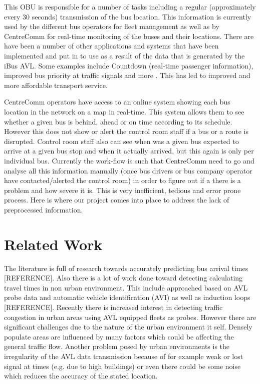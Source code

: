 This OBU is responsible for a number of tasks including a regular (approximately every 30 seconds) transmission of the bus location. This information is currently used by the different bus operators for fleet management as well as by CentreComm for real-time monitoring of the buses and their locations. There are have been a number of other applications and systems that have been implemented and put in to use as a result of the data that is generated by the iBus AVL. Some examples include Countdown (real-time passenger information), improved bus priority at traffic signals and more \cite{Hounsell201276}. This has led to improved and more affordable transport service.

CentreComm operators have access to an online system showing each bus location in the network on a map in real-time. This system allows them to see whether a given bus is behind, ahead or on time according to its schedule. However this does not show or alert the control room staff if a bus or a route is disrupted. Control room staff also can see when was a given bus expected to arrive at a given bus stop and when it actually arrived, but this again is only per individual bus. Currently the work-flow is such that CentreComm need to go and analyse all this information manually (once bus drivers or bus company operator have contacted/alerted the control room) in order to figure out if a there is a problem and how severe it is. This is very inefficient, tedious and error prone process. Here is where our project comes into place to address the lack of preprocessed information.

\section{Related Work}
The literature is full of research towards accurately predicting bus arrival times [REFERENCE]. Also there is a lot of work done toward detecting calculating travel times in non urban environment. This include approached based on AVL probe data and automatic vehicle identification (AVI) as well as induction loops [REFERENCE]. Recently there is increased interest in detecting traffic congestion in urban areas using AVL equipped fleets as probes. However there are significant challenges due to the nature of the urban environment it self. Densely populate areas are influenced by many factors which could be affecting the general traffic flow. Another problem posed by urban environments is the irregularity of the AVL data transmission because of for example weak or lost signal at times (e.g. due to high buildings) or even there could be some noise which reduces the accuracy of the stated location. 

